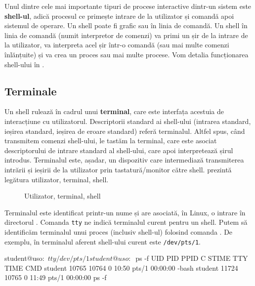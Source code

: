 Unul dintre cele mai importante tipuri de procese interactive dintr-un sistem
este \textbf{shell-ul}, adică procesul ce primește intrare de la utilizator și comandă
apoi sistemul de operare. Un shell poate fi grafic sau în linia de comandă. Un
shell în linia de comandă (numit interpretor de comenzi) va primi un șir de la
intrare de la utilizator, va interpreta acel șir într-o comandă (sau mai multe
comenzi înlănțuite) și va crea un proces sau mai multe procese. Vom detalia
funcționarea shell-ului în .

\subsection{Terminale}
\label{sec:process-interactivitate-terminale}

Un shell rulează în cadrul unui \textbf{terminal}, care este interfața acestuia de
interacțiune cu utilizatorul. Descriptorii standard ai shell-ului (intrarea
standard, ieșirea standard, ieșirea de eroare standard) referă terminalul.
Altfel spus, când transmitem comenzi shell-ului, le tastăm la terminal, care
este asociat descriptorului de intrare standard al shell-ului, care apoi
interpretează șirul introdus. Terminalul este, așadar, un dispozitiv care
intermediază transmiterea intrării și ieșirii de la utilizator prin tastatură/monitor către
shell.  prezintă legătura utilizator, terminal, shell.

\begin{figure}[!htbp]
	\centering
	\def\svgwidth{0.8\textwidth}
	
	\caption{Utilizator, terminal, shell}
	\label{fig:process-terminal-shell}
\end{figure}

Terminalul este identificat printr-un nume și are asociată, în Linux, o intrare
în directorul . Comanda \texttt{tty} ne indică terminalul curent pentru un shell.
Putem să identificăm terminalul unui proces (inclusiv shell-ul) folosind comanda
. De exemplu, în  terminalul aferent shell-ului curent este \texttt{/dev/pts/1}.

\begin{screen}[caption={Identificarea terminalului unui proces},label={lst:process:get-terminal}]
student@uso:~$ tty
/dev/pts/1
student@uso:~$ ps -f
UID        PID  PPID  C STIME TTY          TIME CMD
student  10765 10764  0 10:50 pts/1    00:00:00 -bash
student  11724 10765  0 11:49 pts/1    00:00:00 ps -f
\end{screen}

